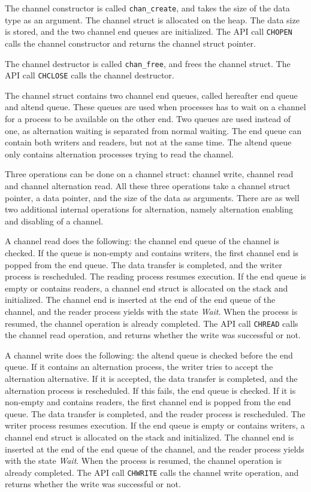 The channel constructor is called \texttt{chan\_create}, and takes the size of the data type as an argument. The channel struct is allocated on the heap. The data size is stored, and the two channel end queues are initialized. The API call \texttt{CHOPEN} calls the channel constructor and returns the channel struct pointer. 

The channel destructor is called \texttt{chan\_free}, and frees the channel struct. The API call \texttt{CHCLOSE} calls the channel destructor.

The channel struct contains two channel end queues, called hereafter end queue and altend queue. These queues are used when processes has to wait on a channel for a process to be available on the other end. Two queues are used instead of one, as alternation waiting is separated from normal waiting. The end queue can contain both writers and readers, but not at the same time. The altend queue only contains alternation processes trying to read the channel. 

Three operations can be done on a channel struct: channel write, channel read and channel alternation read. All these three operations take a channel struct pointer, a data pointer, and the size of the data as arguments. There are as well two additional internal operations for alternation, namely alternation enabling and disabling of a channel. 

A channel read does the following: the channel end queue of the channel is checked. If the queue is non\hyp{}empty and contains writers, the first channel end is popped from the end queue. The data transfer is completed, and the writer process is rescheduled. The reading process resumes execution. If the end queue is empty or contains readers, a channel end struct is allocated on the stack and initialized. The channel end is inserted at the end of the end queue of the channel, and the reader process yields with the state \textit{Wait}. When the process is resumed, the channel operation is already completed. The API call \texttt{CHREAD} calls the channel read operation, and returns whether the write was successful or not. 

A channel write does the following: the altend queue is checked before the end queue. If it contains an alternation process, the writer tries to accept the alternation alternative. If it is accepted, the data transfer is completed, and the alternation process is rescheduled. If this fails, the end queue is checked. If it is non\hyp{}empty and contains readers, the first channel end is popped from the end queue. The data transfer is completed, and the reader process is rescheduled. The writer process resumes execution. If the end queue is empty or contains writers, a channel end struct is allocated on the stack and initialized. The channel end is inserted at the end of the end queue of the channel, and the reader process yields with the state \textit{Wait}. When the process is resumed, the channel operation is already completed. The API call \texttt{CHWRITE} calls the channel write operation, and returns whether the write was successful or not. 

